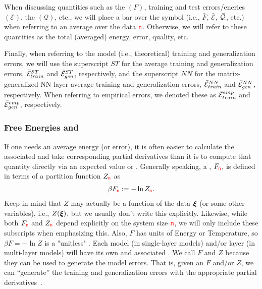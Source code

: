 When discussing quantities such as the \FreeEnergy $(F)$, 
training and test errors/eneries $(\mathcal{E})$, 
the \LayerQuality $(\mathcal{Q})$, etc.,
we will place a bar over the symbol (i.e., $\bar{F}$, $\bar{\mathcal{E}}$, $\bar{\mathcal{Q}}$, etc.) when referring to
an average over the data ${\color{red}\sf{n}}$.
Otherwise, we will refer to these quantities as the total (averaged) energy, error, quality, etc.


Finally, when referring to the model (i.e., theoretical)
training and generalization errors, we will use the superscript $ST$ for
the average \StudentTeacher training and generalization errors, $\bar{\mathcal{E}}^{ST}_{train}$ and $\bar{\mathcal{E}}^{ST}_{gen}$, respectively, and
the superscript $NN$ for the matrix-generalized NN layer average
training and generalization errors, $\bar{\mathcal{E}}^{NN}_{train}$ and $\bar{\mathcal{E}}^{NN}_{gen}$, respectively.
When referring to empirical errors, we denoted these as $\bar{\mathcal{E}}^{emp}_{train}$ and $\bar{\mathcal{E}}^{emp}_{gen}$, respectively.


\subsubsection{Free Energies and \GeneratingFunctions} 
\label{sxn:mathP_free_energies}


If one needs an average energy (or error), 
it is often easier to calculate the associated \FreeEnergy and take corresponding partial derivatives
than it is to compute that quantity directly via an expected value or \ThermalAverage.
Generally speaking, a \FreeEnergy, $F_{{\color{red}\sf{n}}}$, is defined in terms of a partition function $Z_{{\color{red}\sf{n}}}$ as
\begin{align}
\label{eqn:F}
\beta F_{{\color{red}\sf{n}}}:=-\ln Z_{{\color{red}\sf{n}}}.
\end{align}
Keep in mind that $Z$ may actually be a function of the data $\boldsymbol{\xi}$ (or some other variables),
i.e., $Z(\boldsymbol{\xi})$, but we usually don't write this explicitly.
Likewise, while  both $F_{{\color{red}\sf{n}}}$ and $Z_{{\color{red}\sf{n}}}$ depend explicitly on the system size ${\color{red}\sf{n}}$,
we will only include these subscripts when emphasizing this.
Also, $F$ has units of Energy or Temperature, so $\beta F=-\ln Z$ is a "unitless" \FreeEnergy.
%
Each model (in single-layer models) and/or layer (in multi-layer models) will have its own \PartitionFunction and associated \GeneratingFunctions.
We call $F$ and $Z$ \emph{\GeneratingFunctions} because they can be used to generate the model errors. 
That is, given an $F$ and/or $Z$, we can ``generate'' the training and generalization errors with the appropriate partial derivatives~\cite{LTS90, Solla2023}.

